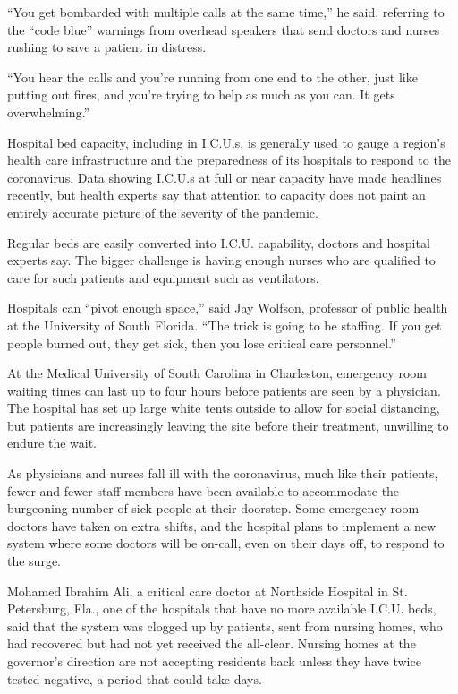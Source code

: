 ``You get bombarded with multiple calls at the same time,'' he said,
referring to the ``code blue'' warnings from overhead speakers that send
doctors and nurses rushing to save a patient in distress.

``You hear the calls and you're running from one end to the other, just
like putting out fires, and you're trying to help as much as you can. It
gets overwhelming.''

Hospital bed capacity, including in I.C.U.s, is generally used to gauge
a region's health care infrastructure and the preparedness of its
hospitals to respond to the coronavirus. Data showing I.C.U.s at full or
near capacity have made headlines recently, but health experts say that
attention to capacity does not paint an entirely accurate picture of the
severity of the pandemic.

Regular beds are easily converted into I.C.U. capability, doctors and
hospital experts say. The bigger challenge is having enough nurses who
are qualified to care for such patients and equipment such as
ventilators.

Hospitals can ``pivot enough space,'' said Jay Wolfson, professor of
public health at the University of South Florida. ``The trick is going
to be staffing. If you get people burned out, they get sick, then you
lose critical care personnel.''

At the Medical University of South Carolina in Charleston, emergency
room waiting times can last up to four hours before patients are seen by
a physician. The hospital has set up large white tents outside to allow
for social distancing, but patients are increasingly leaving the site
before their treatment, unwilling to endure the wait.

As physicians and nurses fall ill with the coronavirus, much like their
patients, fewer and fewer staff members have been available to
accommodate the burgeoning number of sick people at their doorstep. Some
emergency room doctors have taken on extra shifts, and the hospital
plans to implement a new system where some doctors will be on-call, even
on their days off, to respond to the surge.

Mohamed Ibrahim Ali, a critical care doctor at Northside Hospital in St.
Petersburg, Fla., one of the hospitals that have no more available
I.C.U. beds, said that the system was clogged up by patients, sent from
nursing homes, who had recovered but had not yet received the all-clear.
Nursing homes at the governor's direction are not accepting residents
back unless they have twice tested negative, a period that could take
days.

